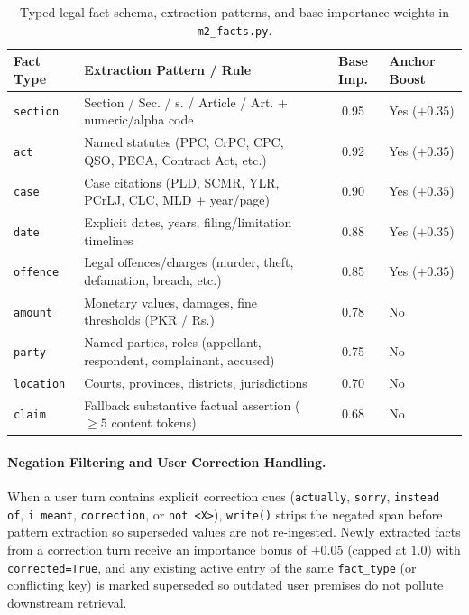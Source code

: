 \documentclass[11pt]{article}
\newcommand{\groupid}{G14}
\begin{document}
\begin{table}[h]
\centering\small
\caption{Typed legal fact schema, extraction patterns, and base importance weights in \texttt{m2\_facts.py}.}
\label{tab:\groupid-schema}
\begin{tabular}{llcl}
\toprule
Fact Type & Extraction Pattern / Rule & Base Imp. & Anchor Boost \\
\midrule
\texttt{section} & Section / Sec. / s. / Article / Art. + numeric/alpha code & 0.95 & Yes ($+0.35$) \\
\texttt{act} & Named statutes (PPC, CrPC, CPC, QSO, PECA, Contract Act, etc.) & 0.92 & Yes ($+0.35$) \\
\texttt{case} & Case citations (PLD, SCMR, YLR, PCrLJ, CLC, MLD + year/page) & 0.90 & Yes ($+0.35$) \\
\texttt{date} & Explicit dates, years, filing/limitation timelines & 0.88 & Yes ($+0.35$) \\
\texttt{offence} & Legal offences/charges (murder, theft, defamation, breach, etc.) & 0.85 & Yes ($+0.35$) \\
\texttt{amount} & Monetary values, damages, fine thresholds (PKR / Rs.) & 0.78 & No \\
\texttt{party} & Named parties, roles (appellant, respondent, complainant, accused) & 0.75 & No \\
\texttt{location} & Courts, provinces, districts, jurisdictions & 0.70 & No \\
\texttt{claim} & Fallback substantive factual assertion ($\ge 5$ content tokens) & 0.68 & No \\
\bottomrule
\end{tabular}
\end{table}

\paragraph{Negation Filtering and User Correction Handling.}
When a user turn contains explicit correction cues (\texttt{actually}, \texttt{sorry}, \texttt{instead of}, \texttt{i meant}, \texttt{correction}, or \texttt{not <X>}), \texttt{write()} strips the negated span before pattern extraction so superseded values are not re-ingested. Newly extracted facts from a correction turn receive an importance bonus of $+0.05$ (capped at $1.0$) with \texttt{corrected=True}, and any existing active entry of the same \texttt{fact\_type} (or conflicting key) is marked superseded so outdated user premises do not pollute downstream retrieval.
\end{document}
